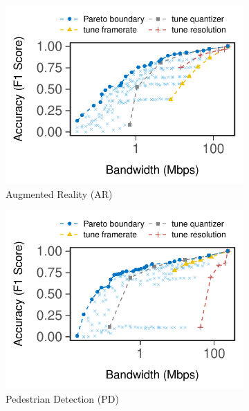 \begin{figure}[htb]
  \centering
  \begin{subfigure}[t]{0.32\textwidth}
    \centering
    \includegraphics[width=\textwidth]{figures/profile-darknet.pdf}
    \caption{Augmented Reality (AR)}
    \label{fig:ar-profile}
  \end{subfigure}
  \hfill
  \begin{subfigure}[t]{0.32\textwidth}
    \centering
    \includegraphics[width=\textwidth]{figures/profile-mot.pdf}
    \caption{Pedestrian Detection (PD)}
    \label{fig:pd-profile}
  \end{subfigure}
  \hfill
  \begin{subfigure}[t]{0.32\textwidth}

\end{subfigure}
\end{figure}
